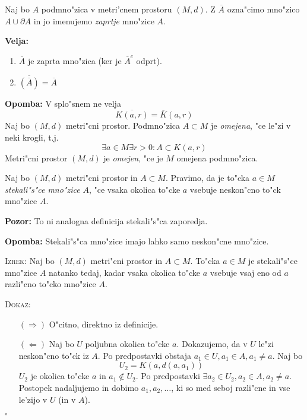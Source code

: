  Naj bo $A$ podmno"zica v metri'cnem prostoru $(M, d)$. Z $\overline{A}$ ozna"cimo mno"zico $A \cup \partial A$ in jo imenujemo \emph{zaprtje} mno"zice $A$.

\textbf{Velja:}
\begin{enumerate}
    \item $\overline{A}$ je zaprta mno"zica (ker je $\overline{A}^c$ odprt).
    \item $\overline{\left( \overline{A} \right)} = \overline{A}$
\end{enumerate}
\textbf{Opomba:} V splo"snem ne velja
\begin{equation*}
\overline{K(a, r)} = \overline{K}(a, r)
\end{equation*}
%
 Naj bo $(M, d)$ metri"cni prostor. Podmno"zica $A \subset M$ je \emph{omejena}, "ce le"zi v neki krogli, t.j.
\begin{equation*}
\exists a \in M \exists r > 0: A \subset K(a, r)
\end{equation*}
Metri"cni prostor $(M, d)$ je \emph{omejen}, "ce je $M$ omejena podmno"zica.

 Naj bo $(M, d)$ metri"cni prostor in $A \subset M$. Pravimo, da je to"cka $a \in M$ \emph{stekali"s"ce mno"zice} $A$, "ce vsaka okolica to"cke $a$ vsebuje neskon"cno to"ck mno"zice $A$.

\textbf{Pozor:} To ni analogna definicija stekali"s"ca zaporedja.

\textbf{Opomba:} Stekali"s"ca mno"zice imajo lahko samo neskon"cne mno"zice.

\textsc{Izrek:} Naj bo $(M, d)$ metri"cni prostor in $A \subset M$. To"cka $a \in M$ je stekali"s"ce mno"zice $A$ natanko tedaj, kadar vsaka okolica to"cke $a$ vsebuje vsaj eno od $a$ razli"cno to"cko mno"zice $A$.

\textsc{Dokaz:}
\begin{itemize}
    \item[$(\Rightarrow)$] O"citno, direktno iz definicije.
    \item[$(\Leftarrow)$] Naj bo $U$ poljubna okolica to"cke $a$. Dokazujemo, da v $U$ le"zi neskon"cno to"ck iz $A$. Po predpostavki obstaja $a_1 \in U, a_1 \in A, a_1 \neq a$. Naj bo
    \begin{equation*}
    U_2 = K(a, d(a, a_1))
    \end{equation*}
    $U_2$ je okolica to"cke $a$ in $a_1 \notin U_2$. Po predpostavki $\exists a_2 \in U_2, a_2 \in A, a_2 \neq a$. Postopek nadaljujemo in dobimo $a_1, a_2, \ldots$, ki so med seboj razli"cne in vse le'zijo v $U$ (in v $A$).
\end{itemize}
\hfill $\square$


